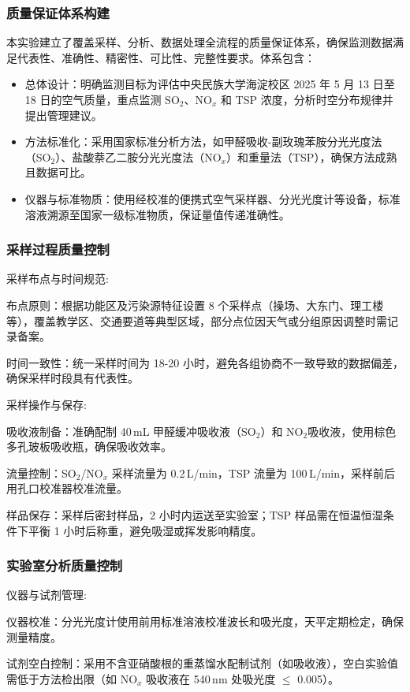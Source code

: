 \documentclass[12pt,hyperref,a4paper,UTF8]{ctexart}
\begin{document}
\subsubsection{质量保证体系构建}
本实验建立了覆盖采样、分析、数据处理全流程的质量保证体系，确保监测数据满足代表性、准确性、精密性、可比性、完整性要求。体系包含：
\begin{itemize}
    \item 总体设计：明确监测目标为评估中央民族大学海淀校区 2025 年 5 月 13 日至 18 日的空气质量，重点监测 SO$_2$、NO$_x$ 和 TSP 浓度，分析时空分布规律并提出管理建议。
    \item 方法标准化：采用国家标准分析方法，如甲醛吸收-副玫瑰苯胺分光光度法（SO$_2$）、盐酸萘乙二胺分光光度法（NO$_x$）和重量法（TSP），确保方法成熟且数据可比。
    \item 仪器与标准物质：使用经校准的便携式空气采样器、分光光度计等设备，标准溶液溯源至国家一级标准物质，保证量值传递准确性。
\end{itemize}
\subsubsection{采样过程质量控制}
采样布点与时间规范:

布点原则：根据功能区及污染源特征设置 8 个采样点（操场、大东门、理工楼等），覆盖教学区、交通要道等典型区域，部分点位因天气或分组原因调整时需记录备案。

时间一致性：统一采样时间为 18-20 小时，避免各组协商不一致导致的数据偏差，确保采样时段具有代表性。

采样操作与保存:

吸收液制备：准确配制 40\,mL 甲醛缓冲吸收液（SO$_2$）和 NO$_2$吸收液，使用棕色多孔玻板吸收瓶，确保吸收效率。

流量控制：SO$_2$/NO$_x$ 采样流量为 0.2\,L/min，TSP 流量为 100\,L/min，采样前后用孔口校准器校准流量。

样品保存：采样后密封样品，2 小时内运送至实验室；TSP 样品需在恒温恒湿条件下平衡 1 小时后称重，避免吸湿或挥发影响精度。

\subsubsection{实验室分析质量控制}
仪器与试剂管理:

仪器校准：分光光度计使用前用标准溶液校准波长和吸光度，天平定期检定，确保测量精度。

试剂空白控制：采用不含亚硝酸根的重蒸馏水配制试剂（如吸收液），空白实验值需低于方法检出限（如 NO$_x$ 吸收液在 540\,nm 处吸光度 $\leq$ 0.005）。
\end{document}
